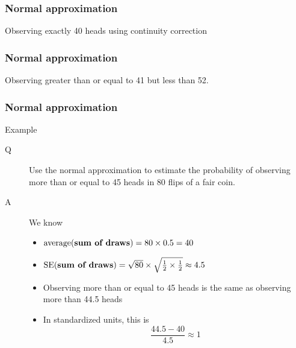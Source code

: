 \documentclass[handout]{beamer}
\begin{document}
   \begin{frame}
   \frametitle{Normal approximation}
   \begin{center}
   \end{center}
   Observing exactly 40 heads using continuity correction
   \end{frame}



   \begin{frame}
   \frametitle{Normal approximation}
   \begin{center}
   \end{center}
   Observing greater than or equal to 41 but less than 52.
   \end{frame}


   \begin{frame} \frametitle{Normal approximation}

   \begin{block}
   {Example}
   \begin{description}
   \item[Q] Use the normal approximation to estimate the
     probability of observing more than or equal to 45 heads in 80 flips of a fair coin.
   \item[A] We know
     \begin{itemize}
     \item $\text{average({\bf sum of draws})} = 80 \times 0.5 = 40 $
     \item $\text{SE({\bf sum of draws})} = \sqrt{80} \times \sqrt{\frac{1}{2}  \times \frac{1}{2}} \approx 4.5 $
     \item Observing more than or equal to 45 heads is the same as observing more than 44.5 heads
       \item In standardized units, this is
       $$
       \frac{44.5-40}{4.5} \approx 1
       $$
     \end{itemize}
   \end{description}
   \end{block}
   \end{frame}
\end{document}
